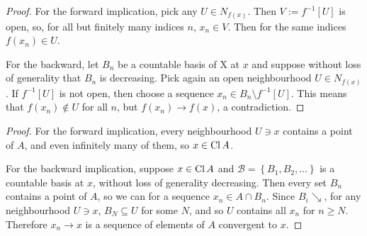 
\begin{proof} 
    For the forward implication, pick any \( U \in N_{f(x)} \). Then \( V := f^{-1}[U] \) is open, so, for all but finitely many indices \( n \), \( x_n \in V \). Then for the same indices \( f(x_n) \in U \).

    For the backward, let \( B_n \) be a countable basis of X at \( x \) and suppose without loss of generality that \( B_n \) is decreasing. Pick again an open neighbourhood \( U \in N_{f(x)} \). If \( f^{-1}[U] \) is not open, then choose a sequence \( x_n \in B_n \setminus f^{-1}[U] \). This means that \( f(x_n) \not\in U \) for all \( n \), but \( f(x_n) \to f(x) \), a contradiction.
\end{proof}


\begin{proof}
    For the forward implication, every neighbourhood \( U \ni x \) contains a point of \( A \), and even infinitely many of them, so \( x \in \operatorname{Cl} A \).

    For the backward implication, suppose \( x \in \operatorname{Cl} A \) and \( \mathcal{B} = \left\{ B_1, B_2, \ldots \right\} \) is a countable basis at \( x \), without loss of generality decreasing. Then every set \( B_n \) contains a point of \( A \), so we can for a sequence \( x_n \in A \cap B_n \). Since \( B_i \searrow \), for any neighbourhood \( U \ni x \), \( B_N \subseteq U \) for some \( N \), and so \( U \) contains all \( x_n \) for \( n \geqslant N \). Therefore \( x_n \to x \) is a sequence of elements of \( A \) convergent to \( x \).
\end{proof}


